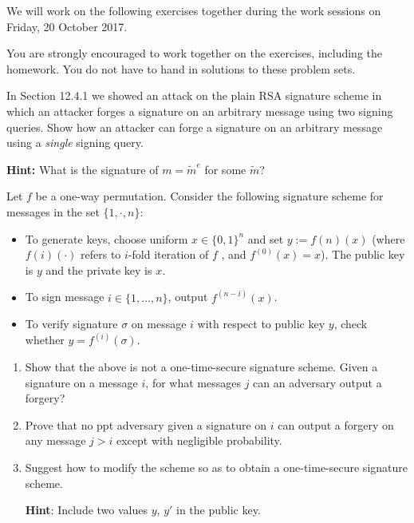 \documentclass[a4paper,10pt,landscape,twocolumn]{scrartcl}
\newcommand\worksession{Friday, 20 October 2017}
\begin{document}
\problems

{\sffamily\noindent
We will work on the following exercises together during the work sessions on \worksession.

You are strongly encouraged to work together on the exercises, including the homework. You do not have to hand in solutions to these problem sets.}


\begin{exercise}

In Section 12.4.1 we showed an attack on the
plain RSA signature scheme in which an attacker forges a signature
on an arbitrary message using two signing queries. Show how an
attacker can forge a signature on an arbitrary message using a
\emph{single} signing query.

\textbf{Hint:} What is the signature of $m=\tilde{m}^e$ for some $\tilde{m}$?
\end{exercise}

\begin{exercise}
	
Let $f$ be a one-way permutation. Consider the following signature
scheme for messages in the set $\{1,\cdot , n\}$:
\begin{itemize}
\item To generate keys, choose uniform $x \in \{0, 1\}^n$ and set $y := f (n) (x)$
(where $f (i) (·)$ refers to $i$-fold iteration of $f$ , and $f^{(0)} (x) = x$). The
public key is $y$ and the private key is $x$.
\item To sign message $i \in \{1,\dots , n\}$, output $f^{(n−i)} (x)$.
\item To verify signature $\sigma$ on message $i$ with respect to public key $y$,
check whether $y = f^{(i)} (\sigma)$.
\end{itemize}

\begin{enumerate}
\item Show that the above is not a one-time-secure signature scheme.
Given a signature on a message $i$, for what messages $j$ can an
adversary output a forgery?
\item Prove that no ppt adversary given a signature on $i$ can output a
forgery on any message $j > i$ except with negligible probability.
\item Suggest how to modify the scheme so as to obtain a one-time-secure
signature scheme.

\textbf{Hint}: Include two values $y$, $y'$ in the public key.	
\end{enumerate}

	
\end{exercise}
\end{document}
